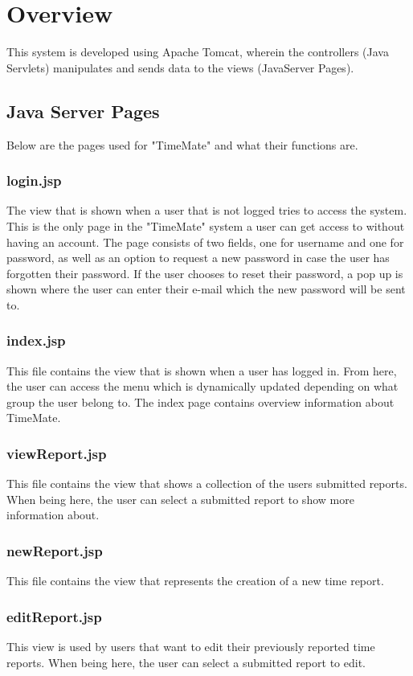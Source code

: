 \documentclass{article}
\begin{document}
\section{Overview}
This system is developed using Apache Tomcat, wherein the controllers (Java Servlets) manipulates and sends data to the views (JavaServer Pages).

\subsection{Java Server Pages}
Below are the pages used for "TimeMate" and what their functions are.

\subsubsection{login.jsp}
The view that is shown when a user that is not logged tries to access the system. This is the only page in the "TimeMate" system a user can get access to without having an account. The page consists of two fields,  one for username and one for password, as well as an option to request a new password in case the user has forgotten their password.  If the user chooses to reset their password, a pop up is shown where the user can enter their e-mail which the new password will be sent to.

\subsubsection{index.jsp}
This file contains the view that is shown when a user has logged in. From here,  the user can access the menu which is dynamically updated depending on what group the user belong to. The index page contains overview information about TimeMate.

\subsubsection{viewReport.jsp}
This file contains the view that shows a collection of the users submitted reports. When being here, the user can select a submitted report to show more information about.

\subsubsection{newReport.jsp}
This file contains the view that represents the creation of a new time report.

\subsubsection{editReport.jsp}
This view is used by users that want to edit their previously reported time reports. When being here, the user can select a submitted report to edit.
\end{document}
